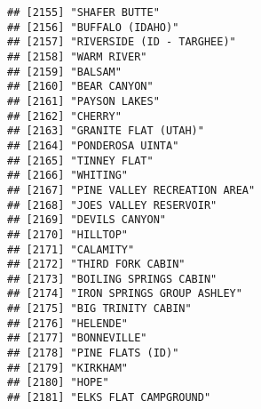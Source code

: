 \documentclass[
]{article}
\begin{document}
\begin{verbatim}
## [2155] "SHAFER BUTTE"                                                                        
## [2156] "BUFFALO (IDAHO)"                                                                     
## [2157] "RIVERSIDE (ID - TARGHEE)"                                                            
## [2158] "WARM RIVER"                                                                          
## [2159] "BALSAM"                                                                              
## [2160] "BEAR CANYON"                                                                         
## [2161] "PAYSON LAKES"                                                                        
## [2162] "CHERRY"                                                                              
## [2163] "GRANITE FLAT (UTAH)"                                                                 
## [2164] "PONDEROSA UINTA"                                                                     
## [2165] "TINNEY FLAT"                                                                         
## [2166] "WHITING"                                                                             
## [2167] "PINE VALLEY RECREATION AREA"                                                         
## [2168] "JOES VALLEY RESERVOIR"                                                               
## [2169] "DEVILS CANYON"                                                                       
## [2170] "HILLTOP"                                                                             
## [2171] "CALAMITY"                                                                            
## [2172] "THIRD FORK CABIN"                                                                    
## [2173] "BOILING SPRINGS CABIN"                                                               
## [2174] "IRON SPRINGS GROUP ASHLEY"                                                           
## [2175] "BIG TRINITY CABIN"                                                                   
## [2176] "HELENDE"                                                                             
## [2177] "BONNEVILLE"                                                                          
## [2178] "PINE FLATS (ID)"                                                                     
## [2179] "KIRKHAM"                                                                             
## [2180] "HOPE"                                                                                
## [2181] "ELKS FLAT CAMPGROUND"                                                                

\end{verbatim}
\end{document}
